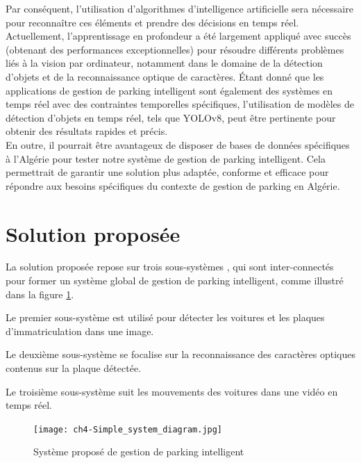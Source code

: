 Par conséquent, l'utilisation d'algorithmes d’intelligence artificielle sera nécessaire pour reconnaître ces éléments et prendre des décisions en temps réel. Actuellement, l'apprentissage en profondeur a été largement appliqué avec succès (obtenant des performances exceptionnelles) pour résoudre différents problèmes liés à la vision par ordinateur, notamment dans le domaine de la détection d'objets et de la reconnaissance optique de caractères. Étant donné que les applications de gestion de parking intelligent sont également des systèmes en temps réel avec des contraintes temporelles spécifiques, l'utilisation de modèles de détection d'objets en temps réel, tels que YOLOv8, peut être pertinente pour obtenir des résultats rapides et précis.\\
En outre, il pourrait être avantageux de disposer de bases de données spécifiques à l’Algérie pour tester notre système de gestion de parking intelligent. Cela permettrait de garantir une solution plus adaptée, conforme et efficace pour répondre aux besoins spécifiques du contexte de gestion de parking en Algérie.

\section{Solution proposée}
La solution proposée repose sur trois sous-systèmes , qui sont inter-connectés pour former un système global de gestion de parking intelligent, comme illustré dans la figure \ref{fig:ch4_Simple_system_diagram}. 

\begin{outline}[enumerate]
    \1 Le premier sous-système est utilisé pour détecter les voitures et les plaques d'immatriculation dans une image.

    \1 Le deuxième sous-système se focalise sur la reconnaissance des caractères optiques contenus sur la plaque détectée. 

    \1 Le troisième  sous-système  suit les mouvements des voitures dans une vidéo en temps réel.
\end{outline}

\begin{figure}[H]
	\centering
	\texttt{[image: ch4-Simple\_system\_diagram.jpg]}
	\caption{Système proposé de gestion de parking intelligent}
 \label{fig:ch4_Simple_system_diagram}
\end{figure}

